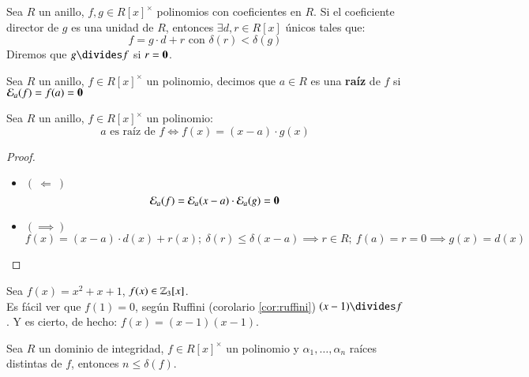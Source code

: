 \begin{pro}
    Sea $R$ un anillo, $f, g \in R[x]^{\times}$ polinomios con coeficientes en $R$. Si el coeficiente director de $g$ es una unidad de $R$, entonces $\exists d,r \in R[x]$ únicos tales que:
    $$
        f = g \cdot d + r \text{ con } \delta(r) < \delta(g)
    $$
    Diremos que $g \divides f$ si $r = \mathbf{0}$.
\end{pro}
\begin{dfn}
    Sea $R$ un anillo, $f \in R[x]^{\times}$ un polinomio, decimos que $a \in R$ es una \textbf{raíz} de $f$ si $\mathcal{E}_a(f) = f(a) = \mathbf{0}$
\end{dfn}
\begin{cor}[Ruffini]\label{cor:ruffini}
    Sea $R$ un anillo, $f \in R[x]^{\times}$ un polinomio:
    $$
        a \text{ es raíz de } f \iff f(x) = (x-a)\cdot g(x)
    $$
\end{cor}
\begin{proof}$ $
    \begin{itemize}
        \item $\left(\  \Longleftarrow\ \right)$
        $$
            \mathcal{E}_a(f) = \mathcal{E}_a(x-a) \cdot \mathcal{E}_a(g) = \mathbf{0}
        $$
        \item $(\implies)$
        $$
            f(x) = (x - a)\cdot d(x) + r(x);\ \delta(r) \leq \delta(x-a) \implies r \in R;\ f(a) = r = 0 \implies g(x) = d(x)
        $$
    \end{itemize}
\end{proof}

\begin{eg}
    Sea $f(x) = x^2 + x + 1$, $f(x) \in \mathbb{Z}_3[x]$.\\ Es fácil ver que $f(1) = 0$, según Ruffini (corolario \ref{cor:ruffini}) $(x-1) \divides f$. Y es cierto, de hecho: $f(x) = (x - 1)(x - 1)$.
\end{eg}

\begin{thm}
    Sea $R$ un dominio de integridad, $f \in R[x]^{\times}$ un polinomio y $\alpha_1, \ldots, \alpha_n$ raíces distintas de $f$, entonces $n \leq \delta(f)$.
\end{thm}
